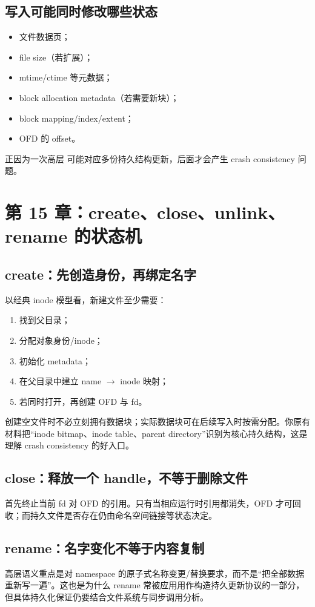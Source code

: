 \documentclass[11pt,a4paper]{ctexart}
\newcommand{\code}[1]{\texttt{\detokenize{#1}}}
\begin{document}
\subsection{写入可能同时修改哪些状态}
\begin{itemize}
  \item 文件数据页；
  \item file size（若扩展）；
  \item mtime/ctime 等元数据；
  \item block allocation metadata（若需要新块）；
  \item block mapping/index/extent；
  \item OFD 的 offset。
\end{itemize}
正因为一次高层 \code{write} 可能对应多份持久结构更新，后面才会产生 crash consistency 问题。

\section{第 15 章：create、close、unlink、rename 的状态机}

\subsection{create：先创造身份，再绑定名字}
以经典 inode 模型看，新建文件至少需要：
\begin{enumerate}
  \item 找到父目录；
  \item 分配对象身份/inode；
  \item 初始化 metadata；
  \item 在父目录中建立 name $\to$ inode 映射；
  \item 若同时打开，再创建 OFD 与 fd。
\end{enumerate}
创建空文件时不必立刻拥有数据块；实际数据块可在后续写入时按需分配。你原有材料把“inode bitmap、inode table、parent directory”识别为核心持久结构，这是理解 crash consistency 的好入口。

\subsection{close：释放一个 handle，不等于删除文件}
\code{close(fd)} 首先终止当前 fd 对 OFD 的引用。只有当相应运行时引用都消失，OFD 才可回收；而持久文件是否存在仍由命名空间链接等状态决定。

\subsection{rename：名字变化不等于内容复制}
高层语义重点是对 namespace 的原子式名称变更/替换要求，而不是“把全部数据重新写一遍”。这也是为什么 rename 常被应用用作构造持久更新协议的一部分，但具体持久化保证仍要结合文件系统与同步调用分析。
\end{document}
